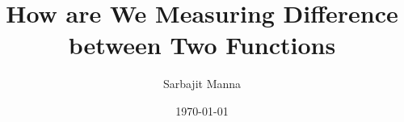 \newcommand{\R}{\mathbb{R}}
\newcommand{\N}{\mathbb{N}}
\newcommand{\Z}{\mathbb{Z}}
\newcommand{\Q}{\mathbb{Q}}
\newcommand{\C}{\mathbb{C}}
\newcommand{\Prob}{\mathbb{P}}
\newcommand{\E}{\mathbb{E}}
\newcommand{\Leb}{\mathcal{L}}
\newcommand{\Borel}{\mathcal{B}}
\newcommand{\fiber}{F}
\newcommand{\confocal}{\Omega}

\DeclareMathOperator{\supp}{supp}
\DeclareMathOperator{\Var}{Var}
\DeclareMathOperator{\Cov}{Cov}
\DeclareMathOperator{\diam}{diam}
\DeclareMathOperator{\dist}{dist}
\DeclareMathOperator{\grad}{grad}
\DeclareMathOperator{\curl}{curl}
\DeclareMathOperator{\div}{div}
\DeclareMathOperator{\tr}{tr}  %

\title{\textbf{How are We Measuring Difference between Two Functions}}
\author{
    Sarbajit Manna
}
\date{\today}